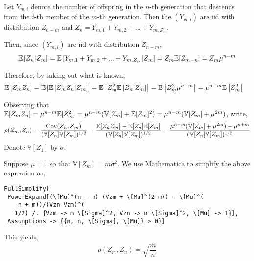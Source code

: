 \begin{solution}[Solution]
Let \( Y_{m,i} \) denote the number of offspring in the \( n \)-th generation that descends from the \( i \)-th member of the \( m \)-th generation. Then the \( (Y_{m,i}) \) are iid with distribution \( Z_{n-m} \) and \( Z_n = Y_{m,1}+Y_{m,2}+...+Y_{m,Z_m} \). %


Then, since \( (Y_{m,i}) \) are iid with distribution \( Z_{n-m} \),
\begin{align*}
    \mathbb{E} \left[ Z_n | Z_m \right] = \mathbb{E} \left[ Y_{m,1}+Y_{m,2}+...+Y_{m,Z_m} | Z_m \right] = Z_m \mathbb{E}[Z_{m-n}] = Z_m \mu^{n-m}
\end{align*}

Therefore, by taking out what is known,
\begin{align*}
    \mathbb{E} \left[ Z_mZ_n \right] &= \mathbb{E} \left[ \mathbb{E} \left[ Z_mZ_n | Z_m \right] \right] = \mathbb{E} \left[ Z_m^2 \mathbb{E}  \left[ Z_n | Z_m \right] \right] 
    = \mathbb{E} \left[ Z_m^2 \mu^{n-m} \right] = \mu^{n-m}\mathbb{E} \left[ Z_m^2 \right]
\end{align*}

Observing that \( \mathbb{E}[Z_mZ_n] = \mu^{n-m}\mathbb{E}[Z_m^2] = \mu^{n-m}(\mathbb{V}[Z_m] + \mathbb{E}[Z_m]^2) = \mu^{n-m}(\mathbb{V}[Z_m]+\mu^{2m}) \), write,
\begin{align*}
    \rho(Z_m,Z_n) &= \dfrac{\operatorname{Cov}(Z_n,Z_m)}{(\mathbb{V}[Z_n] \mathbb{V}[Z_m])^{1/2}} 
    = \dfrac{\mathbb{E}[Z_nZ_m]-\mathbb{E}[Z_n]\mathbb{E}[Z_m]}{(\mathbb{V}[Z_n]\mathbb{V}[Z_m])^{1/2}} 
    = \dfrac{\mu^{n-m}(\mathbb{V}[Z_m]+\mu^{2m})-\mu^{n+m}}{(\mathbb{V}[Z_n]\mathbb{V}[Z_m])^{1/2}} \\
\end{align*}
Denote \( \mathbb{V}[Z_1] \) by \( \sigma \).


Suppose \( \mu=1 \) so that \( \mathbb{V}[Z_m]=m\sigma^2 \). We use Mathematica to simplify the above expression as,
\begin{lstlisting}
FullSimplify[
 PowerExpand[(\[Mu]^(n - m) (Vzm + \[Mu]^(2 m)) - \[Mu]^(
    n + m))/(Vzn Vzm)^(
   1/2) /. {Vzm -> m \[Sigma]^2, Vzn -> n \[Sigma]^2, \[Mu] -> 1}], 
 Assumptions -> {{m, n, \[Sigma], \[Mu]} > 0}]    
\end{lstlisting}

This yields,
\begin{align*}
    \rho(Z_m,Z_n) = \sqrt{\dfrac{m}{n}}
\end{align*}
\iffalse
\begin{align*}
    \rho(Z_m,Z_n) &= \dfrac{\operatorname{Cov}(Z_n,Z_m)}{(\mathbb{V}[Z_n] \mathbb{V}[Z_m])^{1/2}} \\
    &= \dfrac{\EE[Z_nZ_m]-\EE[Z_n]\EE[Z_m]}{(n\sigma^2m\sigma^2)^{1/2}} \\
    &= \dfrac{\mu^{n-m}\EE[Z_m^2]-\mu^n\mu^m}{\sigma^2(nm)^{1/2}} \\
    &= \dfrac{\mu^{n-m}(m\sigma^2+\mu^{2m})-\mu^n\mu^m}{\sigma^2(nm)^{1/2}} \\
    &= \sqrt{\dfrac{m}{n}}\mu^{n-m}
\end{align*}
\fi


\end{solution}
